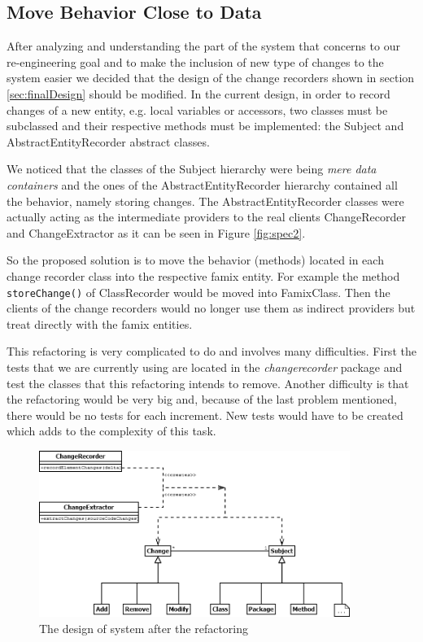 \documentclass[a4paper]{article}
\begin{document}
\subsection{Move Behavior Close to Data}
After analyzing and understanding the part of the system that concerns to our re-engineering goal and to make the inclusion of new type of changes to the system easier we decided that the design of the change recorders shown in section \ref{sec:finalDesign} should be modified. In the current design, in order to record changes of a new entity, e.g. local variables or accessors, two classes must be subclassed and their respective methods must be implemented: the Subject and AbstractEntityRecorder abstract classes. 

We noticed that the classes of the Subject hierarchy were being \emph{mere data containers} and the ones of the AbstractEntityRecorder hierarchy contained all the behavior, namely storing changes. The AbstractEntityRecorder classes were actually acting as the intermediate providers to the real clients ChangeRecorder and ChangeExtractor as it can be seen in Figure \ref{fig:spec2}.

So the proposed solution is to move the behavior (methods) located in each change recorder class into the respective famix entity. For example the method \verb+storeChange()+ of ClassRecorder would be moved into FamixClass. Then the clients of the change recorders would no longer use them as indirect providers but treat directly with the famix entities.

This refactoring is very complicated to do and involves many difficulties. First the tests that we are currently using are located in the \emph{changerecorder} package and test the classes that this refactoring intends to remove. Another difficulty is that the refactoring would be very big and, because of the last problem mentioned, there would be no tests for each increment. New tests would have to be created which adds to the complexity of this task.

\begin{figure}[h]
\centering
\includegraphics[width=0.9\textwidth]{Images/behaviorToData}
\caption{The design of system after the refactoring}
\label{fig:behaviorToData}
\end{figure}
\end{document}
